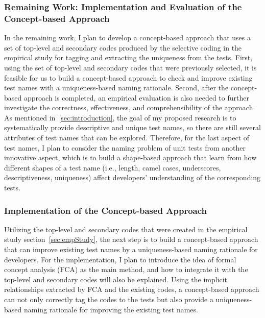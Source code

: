 \subsubsection{Remaining Work: Implementation and Evaluation of the Concept-based Approach}
\label{sec:remaining-work}


In the remaining work, I plan to develop a concept-based approach that uses a set of top-level and secondary codes produced by the selective coding in the empirical study for tagging and extracting the uniqueness from the tests.
%
First, using the set of top-level and secondary codes that were previously selected, it is feasible for us to build a concept-based approach to check and improve existing test names with a uniqueness-based naming rationale.
%
Second, after the concept-based approach is completed, an empirical evaluation is also needed to further investigate the correctness, effectiveness, and comprehensibility of the approach.
%
As mentioned in~\cref{sec:introduction}, the goal of my proposed research is to systematically provide descriptive and unique test names, so there are still several attributes of test names that can be explored.
%
Therefore, for the last aspect of test names, I plan to consider the naming problem of unit tests from another innovative aspect, which is to build a shape-based approach that learn from how different shapes of a test name (i.e., length, camel cases, underscores, descriptiveness, uniqueness) affect developers' understanding of the corresponding tests.

\subsubsection{Implementation of the Concept-based Approach}

Utilizing the top-level and secondary codes that were created in the empirical study section~\cref{sec:empStudy}, the next step is to build a concept-based approach that can improve existing test names by a uniqueness-based naming rationale for developers.
%
For the implementation, I plan to introduce the idea of formal concept analysis (FCA) as the main method, and how to integrate it with the top-level and secondary codes will also be explained.
%
Using the implicit relationships extracted by FCA and the existing codes, a concept-based approach can not only correctly tag the codes to the tests but also provide a uniqueness-based naming rationale for improving the existing test names.

